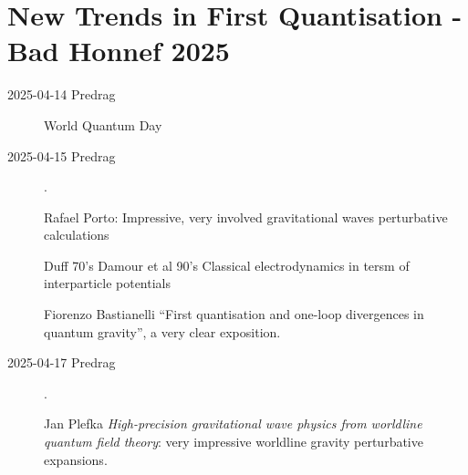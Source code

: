 \section{New Trends in First Quantisation - Bad Honnef 2025}
\label{c-BadHonnef}

\begin{description}

\item[2025-04-14 Predrag] World Quantum Day

\item[2025-04-15 Predrag].

 Rafael Porto:
Impressive, very involved gravitational waves 
perturbative calculations

Duff 70's Damour et al 90's
Classical electrodynamics in tersm of interparticle potentials

Fiorenzo Bastianelli
``First quantisation and one-loop divergences in quantum gravity'',
a very clear exposition.

\item[2025-04-17 Predrag].

Jan Plefka
{\em High-precision gravitational wave physics from worldline quantum field theory}:
very impressive worldline gravity perturbative expansions.

\end{description}


\printbibliography[heading=subbibintoc,title={References}]


\renewcommand{\ssp}{a}
